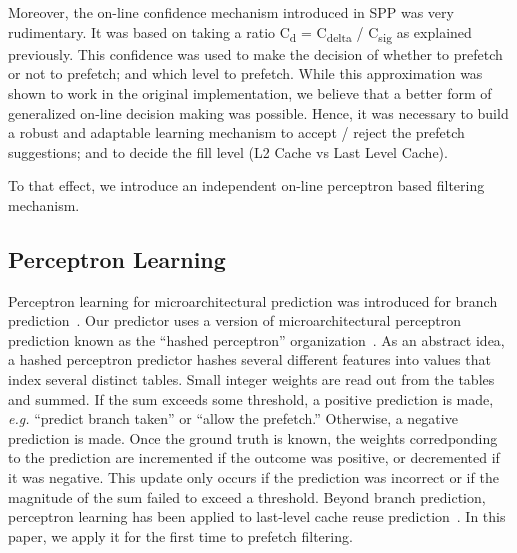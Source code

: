 Moreover, the on-line confidence mechanism introduced in SPP was very
rudimentary.  It was based on taking a ratio C\textsubscript{d} =
C\textsubscript{delta} / C\textsubscript{sig} as explained previously. This
confidence was used to make the decision of whether to prefetch or not to
prefetch; and which level to prefetch.  While this approximation was shown to
work in the original implementation, we believe that a better form of
generalized on-line decision making was possible.  Hence, it was necessary to
build a robust and adaptable learning mechanism to accept / reject the
prefetch suggestions; and to decide the fill level (L2 Cache vs Last Level
Cache).

To that effect, we introduce an independent on-line perceptron based
filtering mechanism.

\subsection{Perceptron Learning}
\label{sec:Background-Perceptron}
Perceptron learning for microarchitectural prediction was introduced for
branch prediction~\cite{PerceptronPredictor}. Our predictor uses a version of
microarchitectural perceptron prediction known as the ``hashed perceptron''
organization~\cite{HashedPerceptron}. As an abstract idea, a hashed perceptron
predictor hashes several different features into values that index several
distinct tables. Small integer weights are read out from the tables and
summed. If the sum exceeds some threshold, a positive prediction is made, {\em
e.g.} ``predict branch taken'' or ``allow the prefetch.'' Otherwise, a
negative prediction is made. Once the ground truth is known, the weights
corredponding to the prediction are incremented if the outcome was positive,
or decremented if it was negative. This update only occurs if the prediction
was incorrect or if the magnitude of the sum failed to exceed a threshold.
Beyond branch prediction, perceptron learning has been applied to last-level
cache reuse prediction~\cite{Perc_Reuse,Multiperspective}. In this paper, we
apply it for the first time to prefetch filtering.



